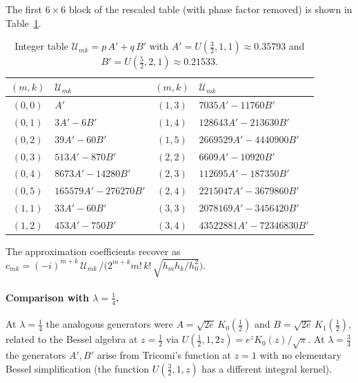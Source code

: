 \documentclass[11pt,a4paper]{article}
\begin{document}
The first $6 \times 6$ block of the rescaled table (with phase factor removed) is shown
in Table~\ref{tab:integer}.

\begin{table}[ht]
\centering
\small
\begin{tabular}{cl@{\qquad}cl}
\toprule
$(m,k)$ & $\mathcal{U}_{mk}$ & $(m,k)$ & $\mathcal{U}_{mk}$ \\
\midrule
$(0,0)$ & $A'$                              & $(1,3)$ & $7035 A' - 11760 B'$ \\
$(0,1)$ & $3A' - 6B'$                       & $(1,4)$ & $128643 A' - 213630 B'$ \\
$(0,2)$ & $39A' - 60B'$                     & $(1,5)$ & $2669529 A' - 4440900 B'$ \\
$(0,3)$ & $513A' - 870B'$                   & $(2,2)$ & $6609 A' - 10920 B'$ \\
$(0,4)$ & $8673A' - 14280B'$                & $(2,3)$ & $112695 A' - 187350 B'$ \\
$(0,5)$ & $165579 A' - 276270 B'$           & $(2,4)$ & $2215047 A' - 3679860 B'$ \\
$(1,1)$ & $33 A' - 60 B'$                   & $(3,3)$ & $2078169 A' - 3456420 B'$ \\
$(1,2)$ & $453 A' - 750 B'$                 & $(3,4)$ & $43522881 A' - 72346830 B'$ \\
\bottomrule
\end{tabular}
\caption{Integer table $\mathcal{U}_{mk} = p\,A' + q\,B'$ with
$A' = U(\tfrac32,1,1) \approx 0.35793$ and $B' = U(\tfrac52,2,1) \approx 0.21533$.}
\label{tab:integer}
\end{table}

\noindent
The approximation coefficients recover as
$c_{mk} = (-i)^{m+k}\,\mathcal{U}_{mk}\,/\bigl(2^{m+k} m!\,k!\,\sqrt{h_m h_k/h_0^2}\bigr)$.

\paragraph{Comparison with $\lambda = \tfrac14$.}
At $\lambda = \tfrac14$ the analogous generators were
$A = \sqrt{2e}\,K_0(\tfrac12)$ and $B = \sqrt{2e}\,K_1(\tfrac12)$,
related to the Bessel algebra at $z = \tfrac12$ via
$U(\tfrac12, 1, 2z) = e^z K_0(z)/\sqrt{\pi}$.
At $\lambda = \tfrac34$ the generators $A', B'$ arise from Tricomi's function at $z = 1$
with no elementary Bessel simplification (the function $U(\tfrac32, 1, z)$ has a different
integral kernel).

\end{document}
